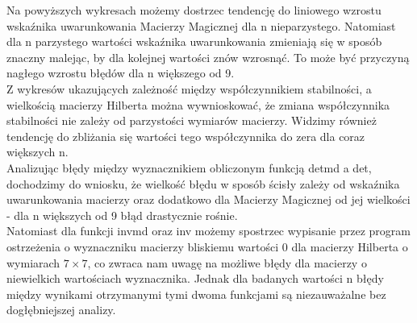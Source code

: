 \documentclass[12pt]{article}
\begin{document}
Na powy\.zszych wykresach mo\.zemy dostrzec tendencj\k{e} do liniowego wzrostu wska\'znika uwarunkowania Macierzy Magicznej dla n nieparzystego. Natomiast dla n parzystego warto\'sci wska\'znika uwarunkowania zmieniaj\k{a} si\k{e} w spos\'ob znaczny malej\k{a}c, by dla kolejnej warto\'sci zn\'ow wzrosn\k{a}\'c. To mo\.ze by\'c przyczyn\k{a} nag\l{}ego wzrostu b\l{}\k{e}d\'ow dla n wi\k{e}kszego od 9.
\\
Z wykres\'ow ukazuj\k{a}cych zale\.zno\'s\'c mi\k{e}dzy wsp\'o\l{}czynnikiem stabilno\'sci, a wielko\'sci\k{a} macierzy Hilberta mo\.zna wywnioskowa\'c, \.ze zmiana wsp\'o\l{}czynnika stabilno\'sci nie zale\.zy od parzysto\'sci wymiar\'ow macierzy. Widzimy r\'ownie\.z tendencj\k{e} do zbli\.zania si\k{e} warto\'sci tego wsp\'o\l{}czynnika do zera dla coraz wi\k{e}kszych n.
\\
Analizuj\k{a}c b\l{}\k{e}dy mi\k{e}dzy wyznacznikiem obliczonym funkcj\k{a} detmd a det, dochodzimy do wniosku, \.ze wielko\'s\'c b\l{}\k{e}du w spos\'ob \'scis\l{}y zale\.zy od wska\'znika uwarunkowania macierzy oraz dodatkowo dla Macierzy Magicznej od jej wielko\'sci - dla n wi\k{e}kszych od 9 b\l{}\k{a}d drastycznie ro\'snie. 
\\
Natomiast dla funkcji invmd oraz inv mo\.zemy spostrzec wypisanie przez program ostrze\.zenia o wyznaczniku macierzy bliskiemu warto\'sci 0 dla macierzy Hilberta o wymiarach $7\times 7$, co zwraca nam uwag\k{e} na mo\.zliwe b\l{}\k{e}dy dla macierzy o niewielkich warto\'sciach wyznacznika. Jednak dla badanych warto\'sci n b\l{}\k{e}dy mi\k{e}dzy wynikami otrzymanymi tymi dwoma funkcjami s\k{a} niezauwa\.zalne bez dog\l{}\k{e}bniejszej analizy. 



\tableofcontents
\end{document}
